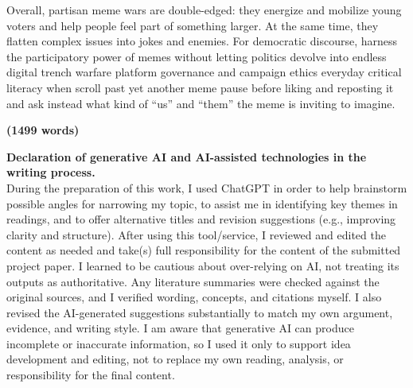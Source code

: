 \documentclass[12pt,twoside]{article}
\begin{document}

Overall, partisan meme wars are double-edged: they energize and mobilize young voters and help people feel part of something larger. At the same time, they flatten complex issues into jokes and enemies. For democratic discourse, harness the participatory power of memes without letting politics devolve into endless digital trench warfare platform governance and campaign ethics\added{,} everyday critical literacy when scroll past yet another meme\added{,} pause before liking and reposting it and ask instead what kind of ``us'' and ``them'' the meme is inviting to imagine.


\vspace{-\baselineskip}

\begin{flushright}\textbf{(1499 words)}\end{flushright}

\vspace{-\baselineskip}

\textbf{Declaration of generative AI and AI-assisted technologies in the writing process.}\\
During the preparation of this work, I used ChatGPT in order to help brainstorm possible angles for narrowing my topic, to assist me in identifying key themes in readings, and to offer alternative titles and revision suggestions (e.g., improving clarity and structure). After using this tool/service, I reviewed and edited the content as needed and take(s) full responsibility for the content of the submitted project paper.
I learned to be cautious about over-relying on AI, not treating its outputs as authoritative. Any literature summaries were checked against the original sources, and I verified wording, concepts, and citations myself. I also revised the AI-generated suggestions substantially to match my own argument, evidence, and writing style. I am aware that generative AI can produce incomplete or inaccurate information, so I used it only to support idea development and editing, not to replace my own reading, analysis, or responsibility for the final content.

\vspace{\baselineskip}

\printbibliography[heading=normalrefs,title={References}]
\end{document}
